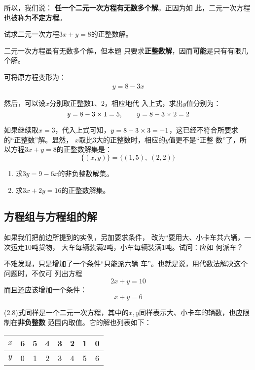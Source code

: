 所以，我们说：
\textbf{任一个二元一次方程有无数多个解}。正因为如
此，二元一次方程也被称为\textbf{不定方程}。

\begin{example}
    试求二元一次方程$3x +y=8$的正整数解。
\end{example}

\begin{analyze}
    二元一次方程虽有无数多个解，但本题
只要求\textbf{正整数解}，因而\textbf{可能}是只有有限几个解。
\end{analyze}

\begin{solution}
可将原方程变形为：
\begin{align*}
    y=8-3x   \tag{移项变号}
\end{align*}

  然后，可以设$x$分别取正整数1、2，相应地代
入上式，求出$y$值分别为：
\[y=8-3\times1=5, \qquad  y=8-3\times 2=2\]

    如果继续取$x=3$，代入上式可知，$y=8-3\times3=-1$，这已经不符合所要求的“正整数”解。显然，
$x$取比3大的正整数时，相应的$y$值更不是“正整
数”了，所以方程$3x +y=8$的正整数解集是：
\[\{(x,y)\}=\{(1,5),\; (2,2)\}  \]

\end{solution}

\begin{ex}
\begin{enumerate}
    \item 求$3y=9-6x$的非负整数解集。
    \item 求$3x+2y=16$的正整数解集。
\end{enumerate}
\end{ex}
          
\subsection{方程组与方程组的解}
    如果我们把前边所提到的实例，另加要求条件，
改为“要用大、小卡车共六辆，一次运走10吨货物，
大车每辆装满2吨，小车每辆装满1吨。试问：应如
何派车？

    不难发现，只是增加了一个条件“只能派六辆
车”。也就是说，用代数法解决这个问题时，不仅可
列出方程
\begin{equation}
    2x+y=10
\end{equation}
而且还应该增加一个条件：
\begin{equation}
    x+y=6
\end{equation}

(2.8)式同样是一个二元一次方程，其中的$x,y$同样表示大、小卡车的辆数，也应限制在\textbf{非负整数}
范围内取值。它的解也列表如下：
\begin{center}
    \begin{tabular}{c|ccccccc}
        \hline
$x$ &6&5&4&3&2&1&0\\
\hline
$y$ &0&1&2&3&4&5&6 \\
\hline      
    \end{tabular}
\end{center}

